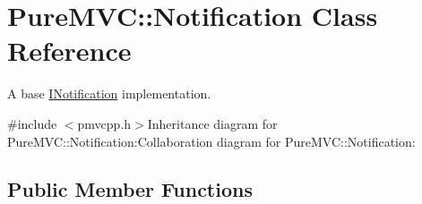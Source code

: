 \hypertarget{class_pure_m_v_c_1_1_notification}{
\section{PureMVC::Notification Class Reference}
\label{class_pure_m_v_c_1_1_notification}
}


A base {\ttfamily \hyperlink{class_pure_m_v_c_1_1_i_notification}{INotification}} implementation.  


{\ttfamily \#include $<$pmvcpp.h$>$}Inheritance diagram for PureMVC::Notification:Collaboration diagram for PureMVC::Notification:\subsection*{Public Member Functions}
